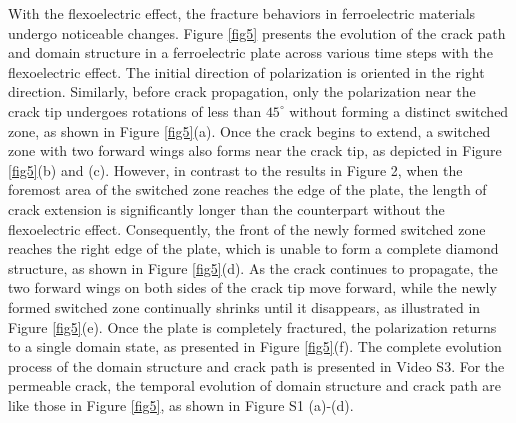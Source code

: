 \documentclass[times,fleqn,11pt]{elsarticle}
\begin{document}
With the flexoelectric effect, the fracture behaviors in ferroelectric materials undergo noticeable changes. Figure \ref{fig5} presents the evolution of the crack path and domain structure in a ferroelectric plate across various time steps with the flexoelectric effect. The initial direction of polarization is oriented in the right direction. Similarly, before crack propagation, only the polarization near the crack tip undergoes rotations of less than $45^\circ$ without forming a distinct switched zone, as shown in Figure \ref{fig5}(a). Once the crack begins to extend, a switched zone with two forward wings also forms near the crack tip, as depicted in Figure \ref{fig5}(b) and (c). However, in contrast to the results in Figure 2, when the foremost area of the switched zone reaches the edge of the plate, the length of crack extension is significantly longer than the counterpart without the flexoelectric effect. Consequently, the front of the newly formed switched zone reaches the right edge of the plate, which is unable to form a complete diamond structure, as shown in Figure \ref{fig5}(d). As the crack continues to propagate, the two forward wings on both sides of the crack tip move forward, while the newly formed switched zone continually shrinks until it disappears, as illustrated in Figure \ref{fig5}(e). Once the plate is completely fractured, the polarization returns to a single domain state, as presented in Figure \ref{fig5}(f). The complete evolution process of the domain structure and crack path is presented in Video S3. For the permeable crack, the temporal evolution of domain structure and crack path are like those in Figure \ref{fig5}, as shown in Figure S1 (a)-(d).
\end{document}
